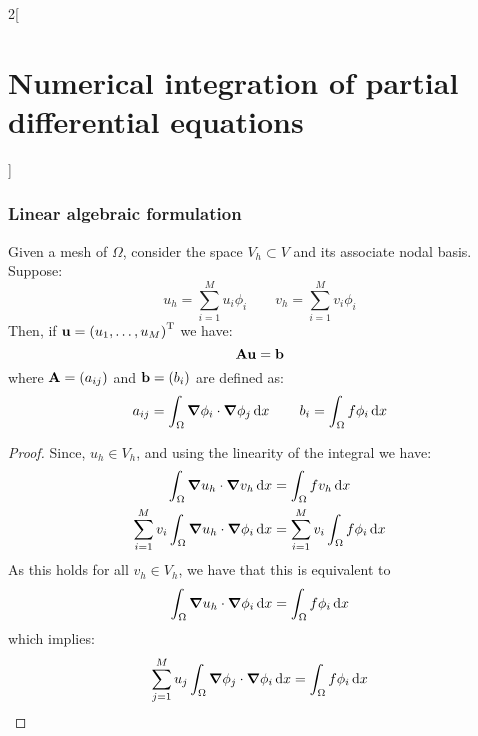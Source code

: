 \documentclass[../../../main_math.tex]{subfiles}
\begin{document}
\begin{multicols}{2}[\section{Numerical integration of partial differential equations}]
  \subsubsection{Linear algebraic formulation}
  \begin{proposition}
    Given a mesh of $\Omega$, consider the space $V_h\subset V$ and its associate nodal basis. Suppose:
    $$
      u_h=\sum_{i=1}^M u_i\phi_i\qquad v_h=\sum_{i=1}^M v_i\phi_i
    $$
    Then, if $\boldsymbol{\mathrm{u}}={(u_1,\ldots,u_M)}^{\mathrm{T}}$ we have:
    $$\boldsymbol{\mathrm{Au}}=\boldsymbol{\mathrm{b}}$$
    where $\boldsymbol{\mathrm{A}}=(a_{ij})$ and $\boldsymbol{\mathrm{b}}=(b_i)$ are defined as:
    \begin{equation*}
      a_{ij} =\int_\Omega \grad{\phi_i}\cdot\grad{\phi_j}\dd{x} \qquad b_i    =\int_\Omega f\phi_i\dd{x}
    \end{equation*}
  \end{proposition}
  \begin{proof}
    Since, $u_h\in V_h$, and using the linearity of the integral we have:
    \begin{align*}
      \int_\Omega \grad{u_h}\cdot\grad{v_h}\dd{x}                     & =\int_\Omega f v_h\dd{x}                    \\
      \sum_{i=1}^M v_i \int_\Omega \grad{u_h}\cdot\grad{\phi_i}\dd{x} & =\sum_{i=1}^M v_i \int_\Omega f\phi_i\dd{x}
    \end{align*}
    As this holds for all $v_h\in V_h$, we have that this is equivalent to
    $$\int_\Omega \grad{u_h}\cdot\grad{\phi_i}\dd{x} =\int_\Omega f\phi_i\dd{x}$$
    which implies:
    $$\sum_{j=1}^M u_j \int_\Omega \grad{\phi_j}\cdot\grad{\phi_i}\dd{x} =\int_\Omega f\phi_i\dd{x}$$
  \end{proof}
\end{multicols}
\end{document}
